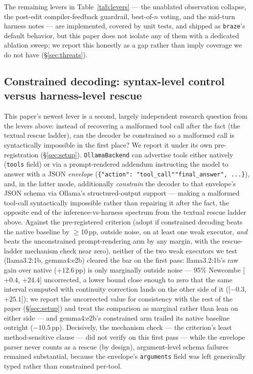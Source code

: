 \documentclass[smallcondensed,natbib]{svjour3}
\begin{document}
The remaining levers in Table~\ref{tab:levers} --- the unablated
observation collapse, the post-edit compiler-feedback guardrail,
best-of-$n$ voting, and the mid-turn harness notes --- are implemented,
covered by unit tests, and shipped as \texttt{braze}'s default behavior,
but this paper does not isolate any of them with a dedicated ablation
sweep; we report this honestly as a gap rather than imply coverage we do
not have (\S\ref{sec:threats}).

\subsection{Constrained decoding: syntax-level control versus
harness-level rescue}\label{sec:constrained}

This paper's newest lever is a second, largely independent research
question from the levers above: instead of recovering a malformed tool
call after the fact (the textual rescue ladder), can the decoder be
constrained so a malformed call is syntactically impossible in the
first place? We report it under its own pre-registration
(\S\ref{sec:setup}). \texttt{OllamaBackend} can advertise tools either
natively (\texttt{tools} field) or via a prompt-rendered addendum
instructing the model to answer with a JSON \emph{envelope}
(\texttt{\{"action": "tool\_call"\textbar"final\_answer", ...\}}), and,
in the latter mode, additionally \emph{constrain} the decoder to that
envelope's JSON schema via Ollama's structured-output support --- making
a malformed tool-call syntactically impossible rather than repairing it
after the fact, the opposite end of the inference-vs-harness spectrum
from the textual rescue ladder above. Against the pre-registered
criterion (adopt if constrained decoding beats the native baseline by
$\ge$10\,pp, outside noise, on at least one weak executor, \emph{and}
beats the unconstrained prompt-rendering arm by any margin, with the
rescue-ladder mechanism check near zero), neither of the two weak
executors we test (llama3.2:1b, gemma4:e2b) cleared the bar on the
first pass: llama3.2:1b's raw gain over native ($+12.6$\,pp) is only
marginally outside noise --- 95\% Newcombe [$+0.4$, $+24.4$]
uncorrected, a lower bound close enough to zero that the same interval
computed with continuity correction lands on the other side of it
([$-0.3$, $+25.1$]); we report the uncorrected value for consistency
with the rest of the paper (\S\ref{sec:setup}) and treat the
comparison as marginal rather than lean on either side --- and
gemma4:e2b's constrained arm trailed its
native baseline outright ($-10.5$\,pp). Decisively, the mechanism
check --- the criterion's least method-sensitive clause --- did
not verify on this first pass --- while the envelope parser never
counts as a rescue (by design), argument-level schema failures remained
substantial, because the envelope's \texttt{arguments} field was left
generically typed rather than constrained per-tool.
\end{document}

